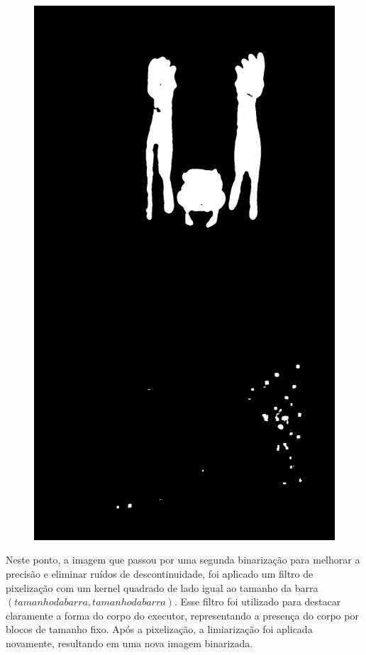 \begin{figure}[H]
\begin{minipage}{\sizeImg\textwidth}
            \includegraphics[width=\textwidth]{figuras/mao_barra/limited2.png}
        \end{minipage}
    \label{fig:blur}
\end{figure}


Neste ponto, a imagem que passou por uma segunda binarização para melhorar a precisão e eliminar ruídos de descontinuidade, foi aplicado um filtro de pixelização com um kernel quadrado de lado igual ao tamanho da barra $(tamanho da barra, tamanho da barra)$. Esse filtro foi utilizado para destacar claramente a forma do corpo do executor, representando a presença do corpo por blocos de tamanho fixo. Após a pixelização, a limiarização foi aplicada novamente, resultando em uma nova imagem binarizada.

